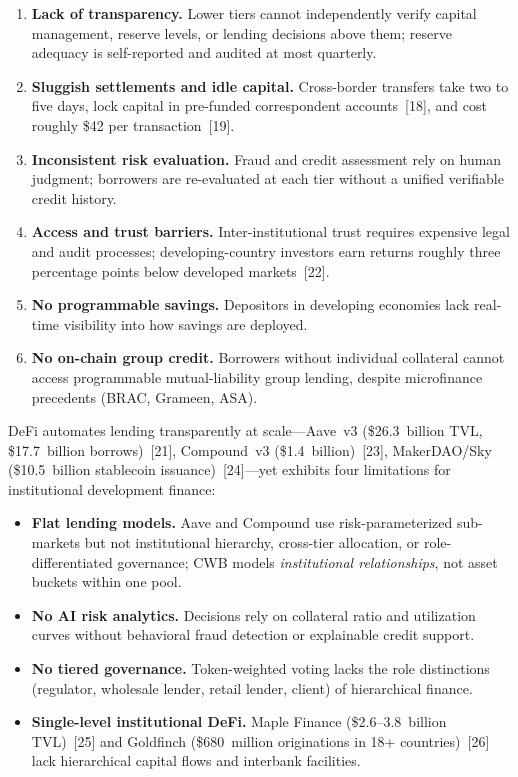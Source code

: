 \documentclass[12pt, a4paper]{report}
\begin{document}
\begin{enumerate}[noitemsep]
\item \textbf{Lack of transparency.} Lower tiers cannot independently verify capital management, reserve levels, or lending decisions above them; reserve adequacy is self-reported and audited at most quarterly.
\item \textbf{Sluggish settlements and idle capital.} Cross-border transfers take two to five days, lock capital in pre-funded correspondent accounts~[18], and cost roughly \$42 per transaction~[19].
\item \textbf{Inconsistent risk evaluation.} Fraud and credit assessment rely on human judgment; borrowers are re-evaluated at each tier without a unified verifiable credit history.
\item \textbf{Access and trust barriers.} Inter-institutional trust requires expensive legal and audit processes; developing-country investors earn returns roughly three percentage points below developed markets~[22].
\item \textbf{No programmable savings.} Depositors in developing economies lack real-time visibility into how savings are deployed.
\item \textbf{No on-chain group credit.} Borrowers without individual collateral cannot access programmable mutual-liability group lending, despite microfinance precedents (BRAC, Grameen, ASA).
\end{enumerate}

DeFi automates lending transparently at scale---Aave~v3 (\$26.3~billion TVL, \$17.7~billion borrows)~[21], Compound~v3 (\$1.4~billion)~[23], MakerDAO/Sky (\$10.5~billion stablecoin issuance)~[24]---yet exhibits four limitations for institutional development finance:

\begin{itemize}[noitemsep]
\item \textbf{Flat lending models.} Aave and Compound use risk-parameterized sub-markets but not institutional hierarchy, cross-tier allocation, or role-differentiated governance; CWB models \textit{institutional relationships}, not asset buckets within one pool.
\item \textbf{No AI risk analytics.} Decisions rely on collateral ratio and utilization curves without behavioral fraud detection or explainable credit support.
\item \textbf{No tiered governance.} Token-weighted voting lacks the role distinctions (regulator, wholesale lender, retail lender, client) of hierarchical finance.
\item \textbf{Single-level institutional DeFi.} Maple Finance (\$2.6--3.8~billion TVL)~[25] and Goldfinch (\$680~million originations in 18+ countries)~[26] lack hierarchical capital flows and interbank facilities.
\end{itemize}
\end{document}
